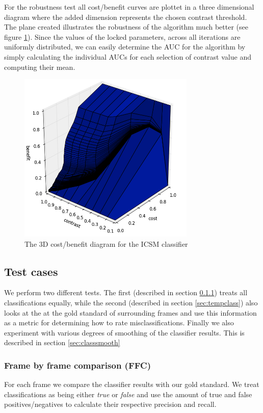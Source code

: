 For the robustness test all cost/benefit curves are plottet in a three dimensional diagram where the added dimension represents the chosen contrast threshold. The plane created illustrates the robustness of the algorithm much better (see figure \ref{fig:3dcostbenefitdiagram}). Since the values of the locked parameters, across all iterations are uniformly distributed, we can easily determine the AUC for the algorithm by simply calculating the individual AUCs for each selection of contrast value and computing their mean.
%
\begin{figure}
     \centering
     \includegraphics[width=0.75\textwidth]{img/3dcostbenefitexample.jpg}
     \caption{The 3D cost/benefit diagram for the ICSM classifier}
     \label{fig:3dcostbenefitdiagram}
\end{figure}
%
\subsection{Test cases}\label{sec:testcases}
%
We perform two different tests. The first (described in section \ref{sec:fbfclass}) treats all classifications equally, while the second (described in section \ref{sec:tempclass}) also looks at the at the gold standard of surrounding frames and use this information as a metric for determining how to rate misclassifications. Finally we also experiment with various degrees of smoothing of the classifier results. This is described in section \ref{sec:classsmooth}
%
\subsubsection{Frame by frame comparison (FFC)}\label{sec:fbfclass}
%
For each frame we compare the classifier results with our gold standard. We treat classifications as being either \textit{true} or \textit{false} and use the amount of true and false positives/negatives to calculate their respective precision and recall.
%
